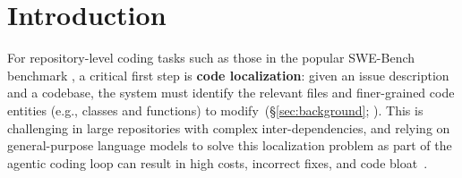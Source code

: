 \section{Introduction}
For repository-level coding tasks such as those in the popular SWE-Bench benchmark \citep{jimenez2024swebenchlanguagemodelsresolve}, a critical first step is \textbf{code localization}: given an issue description and a codebase, the system must identify the relevant files and finer-grained code entities (e.g., classes and functions) to modify~(\S\ref{sec:background}; \citep{husain2019codesearchnet,xia2024agentless}).
This is challenging in large repositories with complex inter-dependencies, and relying on general-purpose language models to solve this localization problem as part of the agentic coding loop can result in high costs, incorrect fixes, and code bloat~\citep{hong2025context}.

